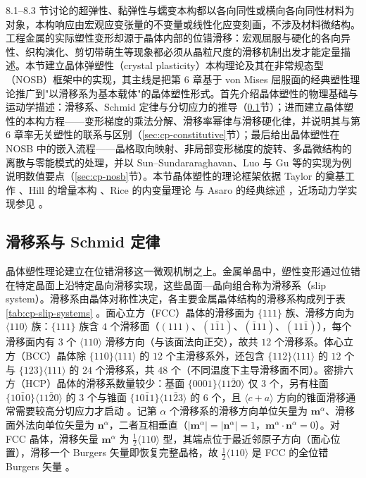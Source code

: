8.1--8.3 节讨论的超弹性、黏弹性与蠕变本构都以各向同性或横向各向同性材料为对象，本构响应由宏观应变张量的不变量或线性化应变刻画，不涉及材料微结构。工程金属的实际塑性变形却源于晶体内部的位错滑移：宏观屈服与硬化的各向异性、织构演化、剪切带萌生等现象都必须从晶粒尺度的滑移机制出发才能定量描述。本节建立晶体弹塑性（crystal plasticity）本构理论及其在非常规态型（NOSB）框架中的实现，其主线是把第 6 章基于 von Mises 屈服面的经典塑性理论推广到"以滑移系为基本载体"的晶体塑性形式。首先介绍晶体塑性的物理基础与运动学描述：滑移系、Schmid 定律与分切应力的推导（\ref{sec:cp-slip-systems}节）；进而建立晶体塑性的本构方程——变形梯度的乘法分解、滑移率幂律与滑移硬化律，并说明其与第 6 章率无关塑性的联系与区别（\ref{sec:cp-constitutive}节）；最后给出晶体塑性在 NOSB 中的嵌入流程——晶格取向映射、非局部变形梯度的旋转、多晶微结构的离散与零能模式的处理，并以 Sun--Sundararaghavan、Luo 与 Gu 等的实现为例说明数值要点（\ref{sec:cp-nosb}节）。本节晶体塑性的理论框架依据 Taylor 的奠基工作 \cite{Taylor1938}、Hill 的增量本构 \cite{Hill1966}、Rice 的内变量理论 \cite{Rice1971} 与 Asaro 的经典综述 \cite{Asaro1983}，近场动力学实现参见 \cite{SunSundararaghavan2014,Littlewood2011,Luo2018,GuZhangMadenci2019}。

\subsection{滑移系与 Schmid 定律}\label{sec:cp-slip-systems}

晶体塑性理论建立在位错滑移这一微观机制之上。金属单晶中，塑性变形通过位错在特定晶面上沿特定晶向滑移实现，这些晶面—晶向组合称为滑移系（slip system）。滑移系由晶体对称性决定，各主要金属晶体结构的滑移系构成列于表\ref{tab:cp-slip-systems} \cite{Taylor1938,Asaro1983,Roters2010}。面心立方（FCC）晶体的滑移面为 $\{111\}$ 族、滑移方向为 $\langle110\rangle$ 族：$\{111\}$ 族含 $4$ 个滑移面（$(111)$、$(1\bar{1}1)$、$(\bar{1}11)$、$(11\bar{1})$），每个滑移面内有 $3$ 个 $\langle110\rangle$ 滑移方向（与该面法向正交），故共 $12$ 个滑移系。体心立方（BCC）晶体除 $\{110\}\langle111\rangle$ 的 $12$ 个主滑移系外，还包含 $\{112\}\langle111\rangle$ 的 $12$ 个与 $\{123\}\langle111\rangle$ 的 $24$ 个滑移系，共 $48$ 个（不同温度下主导滑移面不同）。密排六方（HCP）晶体的滑移系数量较少：基面 $\{0001\}\langle11\bar{2}0\rangle$ 仅 $3$ 个，另有柱面 $\{10\bar{1}0\}\langle11\bar{2}0\rangle$ 的 $3$ 个与锥面 $\{10\bar{1}1\}\langle11\bar{2}3\rangle$ 的 $6$ 个，且 $\langle c+a\rangle$ 方向的锥面滑移通常需要较高分切应力才启动 \cite{Roters2010}。记第 $\alpha$ 个滑移系的滑移方向单位矢量为 $\mathbf{m}^{\alpha}$、滑移面外法向单位矢量为 $\mathbf{n}^{\alpha}$，二者互相垂直（$|\mathbf{m}^{\alpha}|=|\mathbf{n}^{\alpha}|=1$，$\mathbf{m}^{\alpha}\cdot\mathbf{n}^{\alpha}=0$）。对 FCC 晶体，滑移矢量 $\mathbf{m}^{\alpha}$ 为 $\tfrac{1}{2}\langle110\rangle$ 型，其端点位于最近邻原子方向（面心位置），滑移一个 Burgers 矢量即恢复完整晶格，故 $\tfrac{1}{2}\langle110\rangle$ 是 FCC 的全位错 Burgers 矢量 \cite{Asaro1983}。

